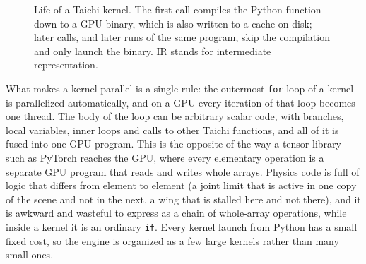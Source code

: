 \begin{figure}[htbp]
\centering
{}
\caption[Life of a Taichi kernel]{Life of a Taichi kernel. The first call compiles the Python function down to a GPU binary, which is also written to a cache on disk; later calls, and later runs of the same program, skip the compilation and only launch the binary. IR stands for intermediate representation.}
\label{fig:taichi-kernel}
\end{figure}

What makes a kernel parallel is a single rule: the outermost \texttt{for} loop of a kernel is parallelized automatically, and on a GPU every iteration of that loop becomes one thread. The body of the loop can be arbitrary scalar code, with branches, local variables, inner loops and calls to other Taichi functions, and all of it is fused into one GPU program. This is the opposite of the way a tensor library such as PyTorch reaches the GPU, where every elementary operation is a separate GPU program that reads and writes whole arrays. Physics code is full of logic that differs from element to element (a joint limit that is active in one copy of the scene and not in the next, a wing that is stalled here and not there), and it is awkward and wasteful to express as a chain of whole-array operations, while inside a kernel it is an ordinary \texttt{if}. Every kernel launch from Python has a small fixed cost, so the engine is organized as a few large kernels rather than many small ones.

